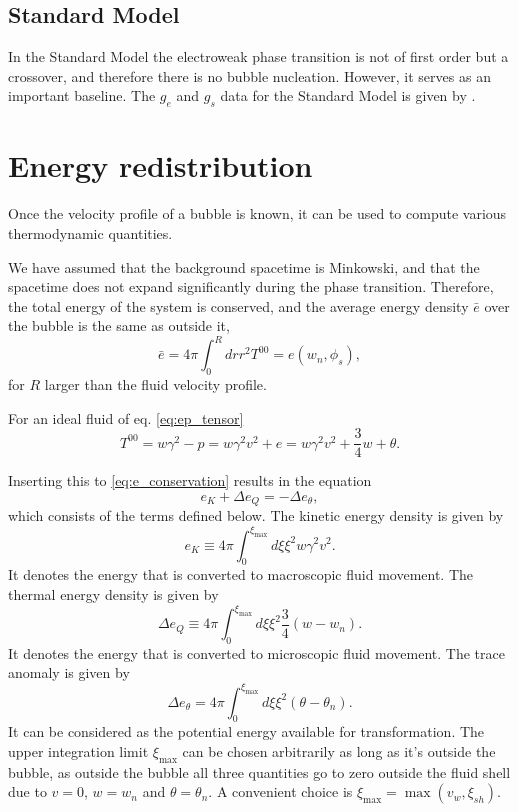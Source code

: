 \subsection{Standard Model}
In the Standard Model the electroweak phase transition is not of first order but a crossover,
and therefore there is no bubble nucleation.
However, it serves as an important baseline.
The $g_e$ and $g_s$ data for the Standard Model is given by \cite{borsanyi_lattice_2016}.


\section{Energy redistribution}
Once the velocity profile of a bubble is known, it can be used to compute various thermodynamic quantities.

We have assumed that the background spacetime is Minkowski, and that the spacetime does not expand significantly during the phase transition.
Therefore, the total energy of the system is conserved, and the average energy density $\bar{e}$ over the bubble is the same as outside it,
\begin{equation}
\bar{e} = 4 \pi \int_0^R dr r^2 T^{00} = e(w_n, \phi_s),
\label{eq:e_conservation}
\end{equation}
for $R$ larger than the fluid velocity profile.

For an ideal fluid of eq. \eqref{eq:ep_tensor}
\begin{equation}
T^{00} = w\gamma^2 - p = w\gamma^2 v^2 + e = w\gamma^2 v^2 + \frac{3}{4}w + \theta.
\end{equation}

Inserting this to \eqref{eq:e_conservation} results in the equation
\begin{equation}
e_K + \Delta e_Q = - \Delta e_\theta,
\end{equation}
which consists of the terms defined below.
The kinetic energy density is given by
\begin{equation}
e_K \equiv 4 \pi \int_0^{\xi_\text{max}} d\xi \xi^2 w \gamma^2 v^2.
\end{equation}
It denotes the energy that is converted to macroscopic fluid movement.
The thermal energy density is given by
\begin{equation}
\Delta e_Q \equiv 4 \pi \int_0^{\xi_\text{max}} d\xi \xi^2 \frac{3}{4} (w - w_n).
\end{equation}
It denotes the energy that is converted to microscopic fluid movement.
The trace anomaly is given by
\begin{equation}
\Delta e_\theta = 4 \pi \int_0^{\xi_\text{max}} d\xi \xi^2 (\theta - \theta_n).
\end{equation}
It can be considered as the potential energy available for transformation.
The upper integration limit $\xi_\text{max}$ can be chosen arbitrarily as long as it's outside the bubble, as outside the bubble all three quantities go to zero outside the fluid shell due to $v=0$, $w=w_n$ and $\theta = \theta_n$.
A convenient choice is $\xi_\text{max} = \max (v_w, \xi_{sh})$.

